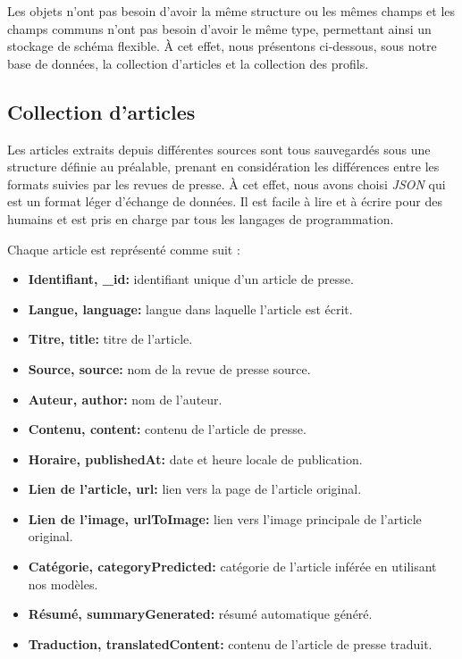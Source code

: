 Les objets n'ont pas besoin d'avoir la même structure ou les mêmes champs et les champs communs n'ont pas besoin d'avoir le même type, permettant ainsi un stockage de schéma flexible. À cet effet, nous présentons ci-dessous, sous notre base de données, la collection d'articles et la collection des profils.

\subsection{Collection d'articles}\label{article-collection}
Les articles extraits depuis différentes sources sont tous sauvegardés sous une structure définie au préalable, prenant en considération les différences entre les formats suivies par les revues de presse. À cet effet, nous avons choisi \emph{JSON} qui est un format léger d'échange de données. Il est facile à lire et à écrire pour des humains \cite{json} et est pris en charge par tous les langages de programmation.

Chaque article est représenté comme suit :
\begin{itemize}
    \item \textbf{Identifiant, \textquotedbl \_id\textquotedbl: } identifiant unique d'un article de presse.
    \item \textbf{Langue, \textquotedbl language\textquotedbl:} langue dans laquelle l'article est écrit.
    \item \textbf{Titre, \textquotedbl title\textquotedbl:} titre de l'article.
    \item \textbf{Source, \textquotedbl source\textquotedbl:} nom de la revue de presse source.
    \item \textbf{Auteur, \textquotedbl author\textquotedbl:} nom de l'auteur.
    \item \textbf{Contenu, \textquotedbl content\textquotedbl:} contenu de l'article de presse.
    \item \textbf{Horaire, \textquotedbl publishedAt\textquotedbl:} date et heure locale de publication.
    \item \textbf{Lien de l'article, \textquotedbl url\textquotedbl:} lien vers la page de l'article original.
    \item \textbf{Lien de l'image, \textquotedbl urlToImage\textquotedbl:} lien vers l'image principale de l'article original.
    \item \textbf{Catégorie, \textquotedbl categoryPredicted\textquotedbl:} catégorie de l'article inférée en utilisant nos modèles.
    \item \textbf{Résumé, \textquotedbl summaryGenerated\textquotedbl:} résumé automatique généré.
    \item \textbf{Traduction, \textquotedbl translatedContent\textquotedbl:} contenu de l'article de presse traduit.\\
\end{itemize}

